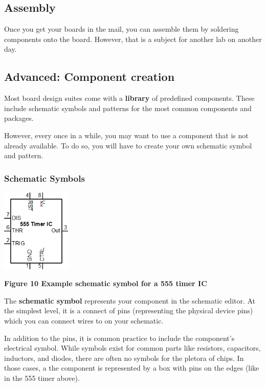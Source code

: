 \documentclass[letterpaper]{article}
\begin{document}
\subsection{Assembly}
\hypertarget{Toc337742689}{}{\sffamily\color[rgb]{0.30980393,0.5058824,0.7411765}
Once you get your boards in the mail, you can assemble them by soldering components onto the board. However, that is a
subject for another lab on another day.}

\subsection{Advanced: Component creation}
\hypertarget{Toc337742690}{}{\sffamily\color[rgb]{0.30980393,0.5058824,0.7411765}
Most board design suites come with a \textbf{library} of predefined components. These include schematic symbols and
patterns for the most common components and packages.}

{\sffamily\color[rgb]{0.30980393,0.5058824,0.7411765}
However, every once in a while, you may want to use a component that is not already available. To do so, you will have
to create your own schematic symbol and pattern.}

\subsubsection{Schematic Symbols}
\hypertarget{Toc337742691}{} \includegraphics[width=1.2992in,height=1.5591in]{figures/ee4document-img004.png} 

{\sffamily\bfseries\color[rgb]{0.30980393,0.5058824,0.7411765}
Figure 10 Example schematic symbol for a 555 timer IC}

{\sffamily\color[rgb]{0.30980393,0.5058824,0.7411765}
The \textbf{schematic symbol} represents your component in the schematic editor. At the simplest level, it is a connect
of pins (representing the physical device pins) which you can connect wires to on your schematic.}

{\sffamily\color[rgb]{0.30980393,0.5058824,0.7411765}
In addition to the pins, it is common practice to include the component's electrical symbol. While symbols exist for
common parts like resistors, capacitors, inductors, and diodes, there are often no symbols for the pletora of chips. In
those cases, a the component is represented by a box with pins on the edges (like in the 555 timer above).}
\end{document}
